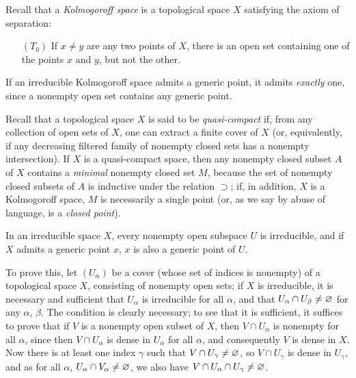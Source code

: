 \begin{env}[2.1.3]
\label{0.2.1.3}
Recall that a \emph{Kolmogoroff space} is a topological space $X$ satisfying the axiom of separation:
\begin{enumerate}
  \item[$(T_0)$] If $x\neq y$ are any two points of $X$, there is an open set containing one of the points $x$ and $y$, but not the other.
\end{enumerate}

If an irreducible Kolmogoroff space admits a generic point, it admits \emph{exactly} one, since a nonempty open set contains any generic point.

Recall that a topological space $X$ is said to be \emph{quasi-compact} if, from any collection of open sets of $X$, one can extract a finite cover of $X$ (or, equivalently, if any decreasing filtered family of nonempty closed sets has a nonempty intersection).
If $X$ is a quasi-compact space, then any nonempty closed subset $A$ of $X$ contains a \emph{minimal} nonempty closed set $M$, because the set of nonempty closed subsets of $A$ is inductive under the relation $\supset$; if, in addition, $X$ is a Kolmogoroff space, $M$ is necessarily a single point (or, as we say by abuse of language, is a \emph{closed point}).
\end{env}

\begin{env}[2.1.4]
\label{0.2.1.4}
In an irreducible space $X$, every nonempty open subspace $U$ is irreducible, and if $X$ admits a generic point $x$, $x$ is also a generic point of $U$.

To prove this, let $(U_\alpha)$ be a cover (whose set of indices is nonempty) of a topological space $X$, consisting of nonempty open sets; if $X$ is irreducible, it is necessary and sufficient that $U_\alpha$ is irreducible for all $\alpha$, and that $U_\alpha\cap U_\beta\neq\varnothing$ for any $\alpha$, $\beta$.
The condition is clearly necessary; to see that it is sufficient, it suffices to prove that if $V$ is a nonempty open subset of $X$, then $V\cap U_\alpha$ is nonempty for all $\alpha$, since then $V\cap U_\alpha$ is dense in $U_\alpha$ for all $\alpha$, and consequently $V$ is dense in $X$.
Now there is at least one index $\gamma$ such that $V\cap U_\gamma\neq\varnothing$, so $V\cap U_\gamma$ is dense in $U_\gamma$, and as for all $\alpha$, $U_\alpha\cap V_\alpha\neq\varnothing$, we also have $V\cap U_\alpha\cap U_\gamma\neq\varnothing$.
\end{env}

